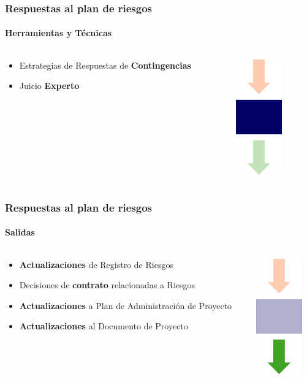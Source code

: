 \frame
{
\frametitle{Respuestas al plan de riesgos}
\framesubtitle{Herramientas y Técnicas}
\begin{columns}
	\begin{column}{0.8\textwidth}
		\begin{itemize}
			\item <1-> Estrategias de Respuestas de \textbf{Contingencias}
			\item <2-> Juicio \textbf{Experto}
		\end{itemize}
	\end{column}
	\begin{column}{0.2\textwidth}
		\includegraphics[width=2cm]{img/tools}
	\end{column}
\end{columns}
}

\frame
{
\frametitle{Respuestas al plan de riesgos}
\framesubtitle{Salidas}
\begin{columns}
	\begin{column}{0.8\textwidth}
		\begin{itemize}
			\item <1-> \textbf{Actualizaciones} de Registro de Riesgos
			\item <2-> Decisiones de \textbf{contrato} relacionadas a Riesgos
			\item <3-> \textbf{Actualizaciones} a Plan de Administración de Proyecto
			\item <4-> \textbf{Actualizaciones} al Documento de Proyecto
		\end{itemize}
	\end{column}
	\begin{column}{0.2\textwidth}
		\includegraphics[width=2cm]{img/output}
	\end{column}
\end{columns}
}
